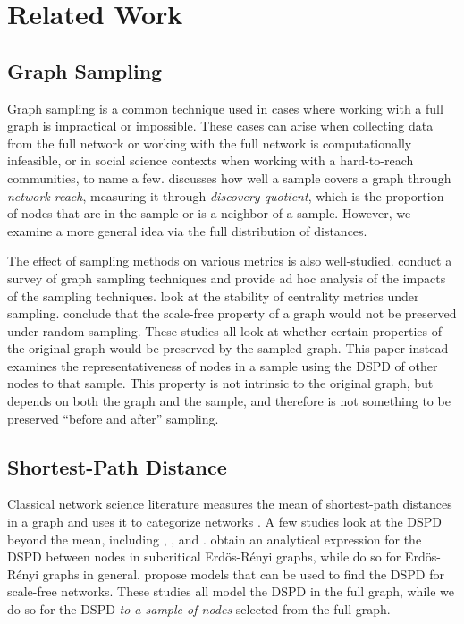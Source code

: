 \section{Related Work}
\label{sec:related}

\subsection{Graph Sampling}

Graph sampling is a common technique used in cases where working with a full graph is impractical or impossible. These cases can arise when collecting data from the full network or working with the full network is computationally infeasible, or in social science contexts when working with a hard-to-reach communities, to name a few.
\citet{maiya2011benefits} discusses how well a sample covers a graph through \textit{network reach}, measuring it through \textit{discovery quotient}, which is the proportion of nodes that are in the sample or is a neighbor of a sample. However, we examine a more general idea via the full distribution of distances.

The effect of sampling methods on various metrics is also well-studied.
\citet{hu2013survey} conduct a survey of graph sampling techniques and provide ad hoc analysis of the impacts of the sampling techniques.
\citet{costenbader2003stability} look at the stability of centrality metrics under sampling. \citet{stumpf2005subnets} conclude that the scale-free property of a graph would not be preserved under random sampling.
These studies all look at whether certain properties of the original graph would be preserved by the sampled graph. This paper instead examines the representativeness of nodes in a sample using the DSPD of other nodes to that sample. This property is not intrinsic to the original graph, but depends on both the graph and the sample, and therefore is not something to be preserved ``before and after'' sampling.

\subsection{Shortest-Path Distance}
Classical network science literature measures the mean of shortest-path distances in a graph and uses it to categorize networks \cite{watts1998collective}. 
A few studies look at the DSPD beyond the mean, including \citet{katzav2018distribution}, 
\citet{ventrella2018modeling}, and \citet{katzav2015analytical}. \citet{katzav2018distribution} obtain an analytical expression for the DSPD between nodes in subcritical Erd\"os-R\'enyi graphs, while \citet{katzav2015analytical} do so for Erd\"os-R\'enyi graphs in general. \citet{ventrella2018modeling} propose models that can be used to find the DSPD for scale-free networks. These studies all model the DSPD in the full graph, while we do so for the DSPD \textit{to a sample of nodes} selected from the full graph.

